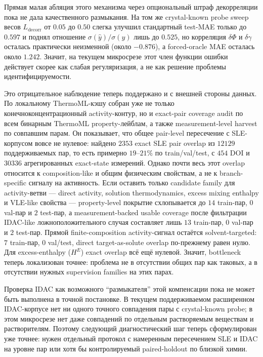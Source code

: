 \documentclass[11pt]{article}
\theoremstyle{definition}
\begin{document}
Прямая малая абляция этого механизма через опциональный штраф декорреляции пока не дала качественного размыкания. На том же crystal-known probe sweep весов $L_{\mathrm{decorr}}$ от $0.05$ до $0.50$ слегка улучшил стандартный test-MAE только до $0.597$ и поднял отношение $\sigma(\hat y)/\sigma(y)$ лишь до $0.525$, но корреляция $\delta\Phi$ и $\delta\gamma$ осталась практически неизменной (около $-0.876$), а forced-oracle MAE осталась около $1.242$. Значит, на текущем микросрезе этот член функции ошибки действует скорее как слабая регуляризация, а не как решение проблемы идентифицируемости.

Это отрицательное наблюдение теперь поддержано и с внешней стороны данных. По локальному ThermoML-кэшу собран уже не только конечноконцентрационный activity-контур, но и exact-pair coverage audit по всем бинарным ThermoML property-лейблам, а также measurement-level harvest по совпавшим парам. Он показывает, что общее pair-level пересечение с SLE-корпусом вовсе не нулевое: найдено $2353$ exact SLE pair overlap из $12129$ поддерживаемых пар, то есть примерно $19$--$21\%$ по train/val/test, с $454$ DOI и $30336$ агрегированных exact-state измерений. Однако почти весь этот overlap относится к composition-like и общим физическим свойствам, а не к branch-specific сигналу на активность. Если оставить только candidate family для activity-ветви --- direct activity, solution thermodynamics, excess mixing enthalpy и VLE-like свойства --- property-level покрытие схлопывается до $14$ train-пар, $0$ val-пар и $2$ test-пар, а measurement-backed usable coverage после фильтрации IDAC-like ложноположительного случая составляет лишь $13$ train-пар, $0$ val-пар и $2$ test-пар. Прямой finite-composition activity-сигнал остаётся solvent-targeted: $7$ train-пар, $0$ val/test, direct target-as-solute overlap по-прежнему равен нулю. Для excess-enthalpy (\(H^E\)) exact overlap всё ещё нулевой. Значит, bottleneck теперь локализован точнее: проблема не в отсутствии общих пар как таковых, а в отсутствии нужных supervision families на этих парах.

Проверка IDAC как возможного ``размыкателя'' этой компенсации пока не может быть выполнена в точной постановке. В текущем поддерживаемом расширенном IDAC-корпусе нет ни одного точного совпадения пары с crystal-known probe; в этом микросрезе нет даже совпадений по отдельным растворяемым веществам и растворителям. Поэтому следующий диагностический шаг теперь сформулирован уже точнее: нужен отдельный протокол с намеренным пересечением SLE и IDAC на уровне пар или хотя бы контролируемый paired-holdout по близкой химии.
\end{document}
